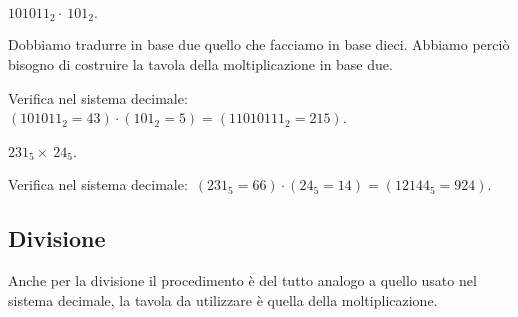 \begin{exrig}

\begin{esempio}
$101011_{2}\cdot~101_{2}.$

Dobbiamo tradurre in base due quello che facciamo in base dieci. Abbiamo
perciò bisogno di costruire la tavola della moltiplicazione in base
due.
\begin{center}

\end{center}
Verifica nel sistema decimale:~$(101011_{2}=43)\cdot(101_{2}=5)=(11010111_{2}=215)$.
 \end{esempio}
\pagebreak
 \begin{esempio}
 $231_{5}\times~24_{5}$.
\begin{center}
 
\end{center}
 Verifica nel sistema decimale:~$(231_{5}=66)\cdot(24_{5}=14)=(12144_{5}=924)$.
 \end{esempio}
\end{exrig}

\ovalbox{\risolvii \ref{ese:4.27}, \ref{ese:4.28}, \ref{ese:4.29}}

\subsection{Divisione}

Anche per la divisione il procedimento è del tutto analogo a quello
usato nel sistema decimale, la tavola da utilizzare è quella della
moltiplicazione.

